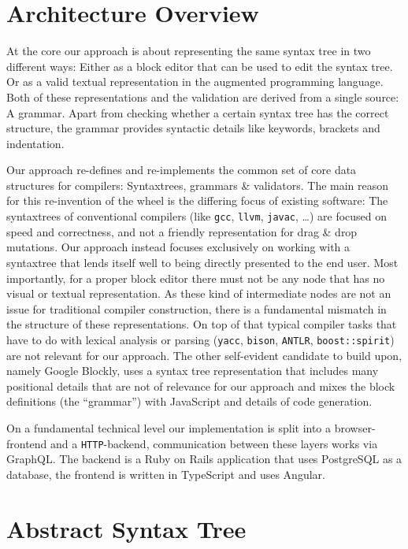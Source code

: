 \documentclass[sigconf,natbib=false,review=true,anonymous]{acmart}
\begin{document}
\section{Architecture Overview}

At the core our approach is about representing the same syntax tree in two different ways: Either as a block editor that can be used to edit the syntax tree. Or as a valid textual representation in the augmented programming language. Both of these representations and the validation are derived from a single source: A grammar. Apart from checking whether a certain syntax tree has the correct structure, the grammar provides syntactic details like keywords, brackets and indentation.

Our approach re-defines and re-implements the common set of core data structures for compilers: Syntax\-trees, grammars \& validators. The main reason for this re-invention of the wheel is the differing focus of existing software: The syntaxtrees of conventional compilers (like \texttt{gcc}, \texttt{llvm}, \texttt{javac}, …) are focused on speed and correctness, and not a friendly representation for drag \& drop mutations. Our approach instead focuses exclusively on working with a syntaxtree that lends itself well to being directly presented to the end user. Most importantly, for a proper block editor there must not be any node that has no visual or textual representation. As these kind of intermediate nodes are not an issue for traditional compiler construction, there is a fundamental mismatch in the structure of these representations. On top of that typical compiler tasks that have to do with lexical analysis or parsing (\texttt{yacc}, \texttt{bison}, \texttt{ANTLR}, \texttt{boost::spirit}) are not relevant for our approach. The other self-evident candidate to build upon, namely Google Blockly, uses a syntax tree representation that includes many positional details that are not of relevance for our approach and mixes the block definitions (the \enquote{grammar}) with JavaScript and details of code generation.

On a fundamental technical level our implementation is split into a browser-frontend and a \texttt{HTTP}-backend, communication between these layers works via GraphQL. The backend is a Ruby on Rails application that uses PostgreSQL as a database, the frontend is written in TypeScript and uses Angular.

\section{Abstract Syntax Tree}
\end{document}
